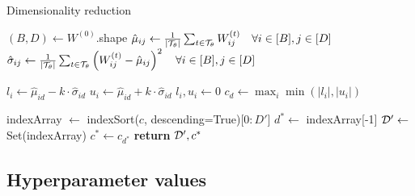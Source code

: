 \begin{algorithm} %
	\caption{Dimensionality reduction} %
	\label{alg:retained-set} %
	\begin{algorithmic} %
		
		\State $(B, D) \gets W^{(0)}$.shape
		\State $\hat{\mu}_{ij} \gets \frac{1}{|\mathcal{T}_\theta|} \sum_{t \in \mathcal{T}_\theta} W_{ij}^{(t)} \quad \forall i \in [B], j \in [D]$
		\State $\hat{\sigma}_{ij} \gets \frac{1}{|\mathcal{T}_\theta|} \sum_{t \in \mathcal{T}_\theta} \left( W_{ij}^{(t)} - \hat{\mu}_{ij} \right)^2 \quad \forall i \in [B], j \in [D]$
		
		\item[]
		
				\State $l_i \gets \hat{\mu}_{id} - k \cdot \hat{\sigma}_{id}$
				\State $u_i \gets \hat{\mu}_{id} + k \cdot \hat{\sigma}_{id}$
					\State $l_i, u_i \gets 0$
				\EndIf
			\EndFor
			\State $c_d \gets \max_i \min\left(|l_i|, |u_i| \right)$
		\EndFor
		
		\item[]
		
		\State indexArray $\gets$ indexSort($c$, descending=True)[$0:D'$]
		\State $d^* \gets$ indexArray[-1]
		\State $\mathcal{D}' \gets $ Set(indexArray)
		\State $c^* \gets c_{d^*}$
		\State \textbf{return} $\mathcal{D}', c^*$
		\EndProcedure
	\end{algorithmic}
\end{algorithm}

\FloatBarrier
\subsection{Hyperparameter values}
\label{appdx:hyperparams}

\begin{table}[!h]
	\centering
	\caption{Hyper-parameter values for each experiment}
	\label{tab:hyperparams}
\end{table}

